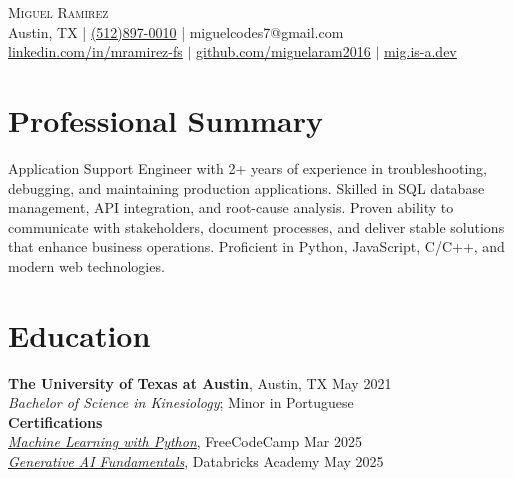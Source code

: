 \documentclass[letterpaper,10pt]{article}
\begin{document}
\begin{center}
  {\Large \scshape Miguel Ramirez} \\ \vspace{0pt}
  Austin, TX | \href{tel:+15128970010}{(512)897-0010} | miguelcodes7@gmail.com \\
  \href{https://linkedin.com/in/mramirez-fs}{linkedin.com/in/mramirez-fs} $|$
  \href{https://github.com/miguelaram2016}{github.com/miguelaram2016} $|$
  \href{https://mig.is-a.dev}{mig.is-a.dev}
\end{center}

\section*{Professional Summary}
\begin{compactitem}
  \item[]
    Application Support Engineer with 2+ years of experience in troubleshooting, debugging, and maintaining production applications. Skilled in SQL database management, API integration, and root-cause analysis. Proven ability to communicate with stakeholders, document processes, and deliver stable solutions that enhance business operations. Proficient in Python, JavaScript, C/C++, and modern web technologies.
\end{compactitem}

\section*{Education}
\begin{compactitem}
  \item[]
    \textbf{The University of Texas at Austin}, Austin, TX \hfill May 2021 \\
    \textit{Bachelor of Science in Kinesiology}; Minor in Portuguese \vspace{3pt} \\ 
    \textbf{Certifications} \\
    \textit{\href{https://www.freecodecamp.org/certification/migglenero/machine-learning-with-python-v7}{Machine Learning with Python}}, FreeCodeCamp \hfill Mar 2025 \\
    \textit{\href{https://credentials.databricks.com/052cc354-c947-42d8-81bb-40c38d77ace3\#acc.B2op0GxP}{Generative AI Fundamentals}}, Databricks Academy \hfill May 2025
\end{compactitem}

\end{document}
